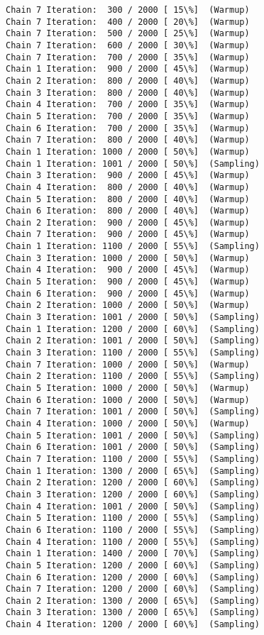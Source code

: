 \documentclass[11pt]{article}
\begin{document}
\begin{Verbatim}[commandchars=\\\{\}]
Chain 7 Iteration:  300 / 2000 [ 15\%]  (Warmup)
Chain 7 Iteration:  400 / 2000 [ 20\%]  (Warmup)
Chain 7 Iteration:  500 / 2000 [ 25\%]  (Warmup)
Chain 7 Iteration:  600 / 2000 [ 30\%]  (Warmup)
Chain 7 Iteration:  700 / 2000 [ 35\%]  (Warmup)
Chain 1 Iteration:  900 / 2000 [ 45\%]  (Warmup)
Chain 2 Iteration:  800 / 2000 [ 40\%]  (Warmup)
Chain 3 Iteration:  800 / 2000 [ 40\%]  (Warmup)
Chain 4 Iteration:  700 / 2000 [ 35\%]  (Warmup)
Chain 5 Iteration:  700 / 2000 [ 35\%]  (Warmup)
Chain 6 Iteration:  700 / 2000 [ 35\%]  (Warmup)
Chain 7 Iteration:  800 / 2000 [ 40\%]  (Warmup)
Chain 1 Iteration: 1000 / 2000 [ 50\%]  (Warmup)
Chain 1 Iteration: 1001 / 2000 [ 50\%]  (Sampling)
Chain 3 Iteration:  900 / 2000 [ 45\%]  (Warmup)
Chain 4 Iteration:  800 / 2000 [ 40\%]  (Warmup)
Chain 5 Iteration:  800 / 2000 [ 40\%]  (Warmup)
Chain 6 Iteration:  800 / 2000 [ 40\%]  (Warmup)
Chain 2 Iteration:  900 / 2000 [ 45\%]  (Warmup)
Chain 7 Iteration:  900 / 2000 [ 45\%]  (Warmup)
Chain 1 Iteration: 1100 / 2000 [ 55\%]  (Sampling)
Chain 3 Iteration: 1000 / 2000 [ 50\%]  (Warmup)
Chain 4 Iteration:  900 / 2000 [ 45\%]  (Warmup)
Chain 5 Iteration:  900 / 2000 [ 45\%]  (Warmup)
Chain 6 Iteration:  900 / 2000 [ 45\%]  (Warmup)
Chain 2 Iteration: 1000 / 2000 [ 50\%]  (Warmup)
Chain 3 Iteration: 1001 / 2000 [ 50\%]  (Sampling)
Chain 1 Iteration: 1200 / 2000 [ 60\%]  (Sampling)
Chain 2 Iteration: 1001 / 2000 [ 50\%]  (Sampling)
Chain 3 Iteration: 1100 / 2000 [ 55\%]  (Sampling)
Chain 7 Iteration: 1000 / 2000 [ 50\%]  (Warmup)
Chain 2 Iteration: 1100 / 2000 [ 55\%]  (Sampling)
Chain 5 Iteration: 1000 / 2000 [ 50\%]  (Warmup)
Chain 6 Iteration: 1000 / 2000 [ 50\%]  (Warmup)
Chain 7 Iteration: 1001 / 2000 [ 50\%]  (Sampling)
Chain 4 Iteration: 1000 / 2000 [ 50\%]  (Warmup)
Chain 5 Iteration: 1001 / 2000 [ 50\%]  (Sampling)
Chain 6 Iteration: 1001 / 2000 [ 50\%]  (Sampling)
Chain 7 Iteration: 1100 / 2000 [ 55\%]  (Sampling)
Chain 1 Iteration: 1300 / 2000 [ 65\%]  (Sampling)
Chain 2 Iteration: 1200 / 2000 [ 60\%]  (Sampling)
Chain 3 Iteration: 1200 / 2000 [ 60\%]  (Sampling)
Chain 4 Iteration: 1001 / 2000 [ 50\%]  (Sampling)
Chain 5 Iteration: 1100 / 2000 [ 55\%]  (Sampling)
Chain 6 Iteration: 1100 / 2000 [ 55\%]  (Sampling)
Chain 4 Iteration: 1100 / 2000 [ 55\%]  (Sampling)
Chain 1 Iteration: 1400 / 2000 [ 70\%]  (Sampling)
Chain 5 Iteration: 1200 / 2000 [ 60\%]  (Sampling)
Chain 6 Iteration: 1200 / 2000 [ 60\%]  (Sampling)
Chain 7 Iteration: 1200 / 2000 [ 60\%]  (Sampling)
Chain 2 Iteration: 1300 / 2000 [ 65\%]  (Sampling)
Chain 3 Iteration: 1300 / 2000 [ 65\%]  (Sampling)
Chain 4 Iteration: 1200 / 2000 [ 60\%]  (Sampling)

\end{Verbatim}
\end{document}
